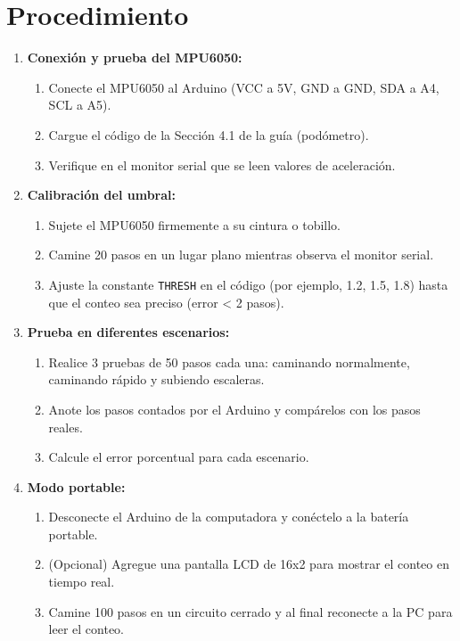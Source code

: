 \section*{Procedimiento}
\begin{enumerate}
    \item \textbf{Conexión y prueba del MPU6050:}
    \begin{enumerate}
        \item Conecte el MPU6050 al Arduino (VCC a 5V, GND a GND, SDA a A4, SCL a A5).
        \item Cargue el código de la Sección 4.1 de la guía (podómetro).
        \item Verifique en el monitor serial que se leen valores de aceleración.
    \end{enumerate}
    \item \textbf{Calibración del umbral:}
    \begin{enumerate}
        \item Sujete el MPU6050 firmemente a su cintura o tobillo.
        \item Camine 20 pasos en un lugar plano mientras observa el monitor serial.
        \item Ajuste la constante \texttt{THRESH} en el código (por ejemplo, 1.2, 1.5, 1.8) hasta que el conteo sea preciso (error < 2 pasos).
    \end{enumerate}
    \item \textbf{Prueba en diferentes escenarios:}
    \begin{enumerate}
        \item Realice 3 pruebas de 50 pasos cada una: caminando normalmente, caminando rápido y subiendo escaleras.
        \item Anote los pasos contados por el Arduino y compárelos con los pasos reales.
        \item Calcule el error porcentual para cada escenario.
    \end{enumerate}
    \item \textbf{Modo portable:}
    \begin{enumerate}
        \item Desconecte el Arduino de la computadora y conéctelo a la batería portable.
        \item (Opcional) Agregue una pantalla LCD de 16x2 para mostrar el conteo en tiempo real.
        \item Camine 100 pasos en un circuito cerrado y al final reconecte a la PC para leer el conteo.
    \end{enumerate}
\end{enumerate}


